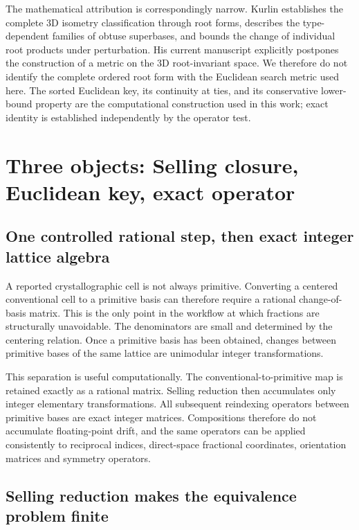 \documentclass[11pt]{article}
\begin{document}
The mathematical attribution is correspondingly narrow. Kurlin establishes the complete 3D isometry classification through root forms, describes the type-dependent families of obtuse superbases, and bounds the change of individual root products under perturbation. His current manuscript explicitly postpones the construction of a metric on the 3D root-invariant space. We therefore do not identify the complete ordered root form with the Euclidean search metric used here. The sorted Euclidean key, its continuity at ties, and its conservative lower-bound property are the computational construction used in this work; exact identity is established independently by the operator test.

\section{Three objects: Selling closure, Euclidean key, exact operator}

\subsection{One controlled rational step, then exact integer lattice algebra}

A reported crystallographic cell is not always primitive. Converting a centered conventional cell to a primitive basis can therefore require a rational change-of-basis matrix. This is the only point in the workflow at which fractions are structurally unavoidable. The denominators are small and determined by the centering relation. Once a primitive basis has been obtained, changes between primitive bases of the same lattice are unimodular integer transformations.

This separation is useful computationally. The conventional-to-primitive map is retained exactly as a rational matrix. Selling reduction then accumulates only integer elementary transformations. All subsequent reindexing operators between primitive bases are exact integer matrices. Compositions therefore do not accumulate floating-point drift, and the same operators can be applied consistently to reciprocal indices, direct-space fractional coordinates, orientation matrices and symmetry operators.

\subsection{Selling reduction makes the equivalence problem finite}
\end{document}
